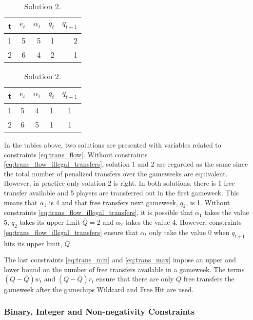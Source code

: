 \begin{table}[H]
\parbox{.45\linewidth}{
\centering
\begin{tabular}{@{}|r|r|r|r|r|@{}}
\hline
t   & $e_{t}$  & $\alpha_{t}$  & $q_{t}$  & $q_{t+1}$   \\
\hline
1  & 5  & 5  & 1  & 2   \\
\hline
2  & 6  & 4  & 2  & 1   \\
\hline
\end{tabular}
\caption*{Solution 1.}
}
\hfill
\parbox{.45\linewidth}{
\centering
\begin{tabular}{@{}|c|c|c|c|c|@{}}
\hline
t   & $e_{t}$  & $\alpha_{t}$  & $q_{t}$  & $q_{t+1}$   \\
\hline
1  & 5  & 4  & 1  & 1   \\
\hline
2  & 6  & 5  & 1  & 1   \\
\hline
\end{tabular}
\caption*{Solution 2.}
}
\end{table}

In the tables above, two solutions are presented with variables related to constraints \eqref{eq:trans_flow}. Without constraints \eqref{eq:trans_flow_illegal_transfers}, solution 1 and 2 are regarded as the same since the total number of penalized transfers over the gameweeks are equivalent. However, in practice only solution 2 is right. In both solutions, there is 1 free transfer available and 5 players are transferred out in the first gameweek. This means that $\alpha_{1}$ is 4 and that free transfers next gameweek, $q_{2}$, is 1. Without constraints \eqref{eq:trans_flow_illegal_transfers}, it is possible that $\alpha_{1}$ takes the value 5, $q_{2}$ takes its upper limit $\overline{Q} = 2$ and $\alpha_{2}$ takes the value 4. However, constraints \eqref{eq:trans_flow_illegal_transfers} ensure that $\alpha_{t}$ only take the value 0 when $q_{t+1}$ hits its upper limit, $\overline{Q}$. 

\newpar

The last constraints \eqref{eq:trans_min} and \eqref{eq:trans_max} impose an upper and lower bound on the number of free transfers available in a gameweek. The terms $(\underline{Q}-\overline{Q})w_{t}$ and $(\underline{Q}-\overline{Q})r_{t}$ ensure that there are only $\underline{Q}$ free transfers the gameweek after the gamechips Wildcard and Free Hit are used. 

\subsubsection{Binary, Integer and Non-negativity Constraints}

